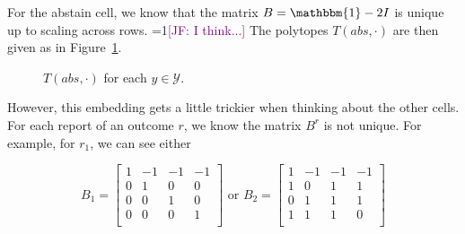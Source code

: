 \documentclass[12pt]{article}
\newcommand{\Comments}{1}
\newcommand{\mynote}[2]{\ifnum\Comments=1\textcolor{#1}{#2}\fi}
\newcommand{\jessie}[1]{\mynote{purple}{[JF: #1]}}
\newcommand{\Y}{\mathcal{Y}}
\newcommand{\ones}{\mathbbm{1}}
\begin{document}
For the abstain cell, we know that the matrix $B = \ones - 2I$ is unique up to scaling across rows. \jessie{I think...}
The polytopes $T(abs, \cdot)$ are then given as in Figure~\ref{fig:abstain-T-report-abs}.
\begin{figure}
\begin{minipage}{0.24\linewidth}
\end{minipage}
\begin{minipage}{0.24\linewidth}
\end{minipage}
\begin{minipage}{0.24\linewidth}
\end{minipage}
\begin{minipage}{0.24\linewidth}
\end{minipage}
\caption{$T(abs, \cdot)$ for each $y \in \Y$.}
\label{fig:abstain-T-report-abs}
\end{figure}

However, this embedding gets a little trickier when thinking about the other cells.
For each report of an outcome $r$, we know the matrix $B^r$ is not unique.
For example, for $r_1$, we can see either

\[ B_1 = \begin{bmatrix}
1 & -1 & -1 & -1 \\
0 & 1 & 0 & 0 \\
0 & 0 & 1 & 0 \\
0 & 0 & 0 & 1 \\
\end{bmatrix} 
% 
\text{ or }
B_2 = 
\begin{bmatrix}
1 & -1 & -1 & -1 \\
1 & 0 & 1 & 1 \\
0 & 1 & 1 & 1 \\
1 & 1 & 1 & 0 \\
\end{bmatrix} 
\]
\end{document}
